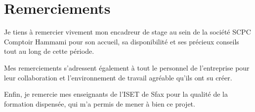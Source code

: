 \chapter*{Remerciements}

Je tiens à remercier vivement mon encadreur de stage au sein de la société SCPC Comptoir Hammami pour son accueil, sa disponibilité et ses précieux conseils tout au long de cette période.

Mes remerciements s'adressent également à tout le personnel de l'entreprise pour leur collaboration et l'environnement de travail agréable qu'ils ont su créer.

Enfin, je remercie mes enseignants de l'ISET de Sfax pour la qualité de la formation dispensée, qui m'a permis de mener à bien ce projet.
